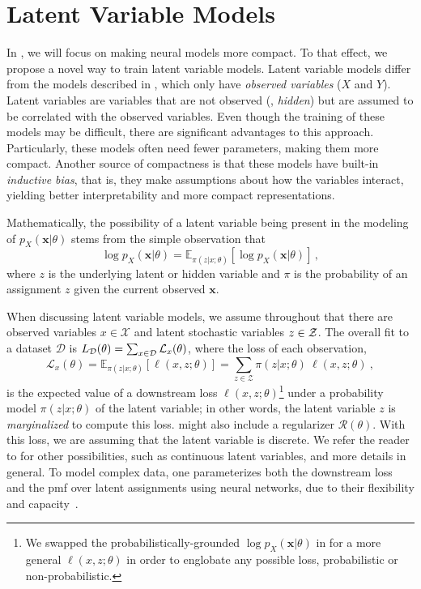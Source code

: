 \section{Latent Variable Models}
\label{sec:lvm}

\noindent In , we will focus on making
neural models more compact. To that effect, we propose a novel way to
train latent variable models. Latent variable models differ from the
models described in , which only have
\textit{observed variables} ($X$ and $Y$). Latent variables are
variables that are not observed (\ie, \textit{hidden}) but are assumed
to be correlated with the observed variables. Even though the
training of these models may be difficult, there are significant
advantages to this approach. Particularly, these models often need
fewer parameters, making them more compact. Another source of
compactness is that these models have built-in \textit{inductive
    bias}, that is, they make assumptions about how the variables
interact, yielding better interpretability and more compact
representations.

Mathematically, the possibility of a latent variable being present
in the modeling of $p_X(\bm{x}|\theta)$ stems from the simple
observation that
%
\begin{equation}\label{eq:lvm}
    \log p_X(\bm{x}|\theta) =
    \mathbb{E}_{\pi(z | x; \theta)} \left[\log p_X(\bm{x}|\theta)\right]\,,
\end{equation}
%
where $z$ is the underlying latent or hidden variable and $\pi$ is the
probability of an assignment $z$ given the current observed $\bm{x}$.

When discussing latent variable models, we assume throughout that there are observed variables
$x \in \mathcal{X}$ and latent stochastic variables $z \in \mathcal{Z}$. The
overall fit to a dataset $\mathcal D$ is $L_\mathcal{D}(\theta) =
    \sum_{x \in \mathcal{D}} \mathcal{L}_x(\theta)$, where the loss of each
observation,
%
\begin{equation}\label{eq:fit}
    \mathcal{L}_{x}(\theta) =
    \mathbb E_{\pi(z|x; \theta)}
    \left[ \ell(x, z; \theta)\right] =
    \sum_{z \in \mathcal Z} \pi(z | x; \theta)~\ell(x, z; \theta) ~,
\end{equation}
%
is the expected value of a downstream loss $\ell(x,z;\theta)$\footnote{
    We swapped the probabilistically-grounded $\log p_X(\bm{x}|\theta)$ in 
    for a more general $\ell(x,z;\theta)$ in order
    to englobate any possible loss, probabilistic or non-probabilistic.
}
under a
probability model $\pi(z|x;\theta)$ of the latent variable; in other
words, the latent variable $z$ is {\it marginalized} to compute this loss.
 might also include a regularizer $\mathcal{R}(\theta)$.
With this loss, we are assuming that the latent variable is discrete. We refer the reader
to \citet{Kim2018} for other possibilities, such as continuous latent variables, and more
details in general.
To model complex data, one parameterizes both the downstream loss and
the pmf over latent assignments using neural networks, due
to their flexibility and capacity~\citep{Kingma+2014:VAE}.

